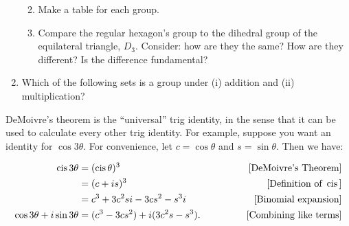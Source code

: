\documentclass[../textbook.tex]{subfiles}
\begin{document}
\begin{enumerate}
\begin{enumerate}
\begin{enumerate}
\begin{multicols}{2}
\end{multicols}
\end{enumerate}
\item Make a table for each group.
\item Compare the regular hexagon's group to the dihedral group of the equilateral triangle, $D_3$. Consider: how are they the same? How are they different? Is the difference fundamental?
\end{enumerate}
\item Which of the following sets is a group under (i) addition and (ii) multiplication?
\begin{enumerate}
\end{enumerate}

\setcounter{problem_i}{\value{enumi}}
\end{enumerate}

\noindent DeMoivre's theorem is the ``universal'' trig identity, in the sense that it can be used to calculate every other trig identity. For example, suppose you want an identity for $\cos 3\theta$. For convenience, let $c=\cos\theta$ and $s=\sin\theta$. Then we have:

\begin{align*}
\operatorname{cis} 3\theta &= (\operatorname{cis} \theta)^3  & \qquad \text{[DeMoivre's Theorem]} \\
&= (c+is)^3 & \qquad \text{[Definition of } \operatorname{cis} \text{]} \\
&= c^3 + 3c^2s i - 3cs^2 - s^3 i & \qquad \text{[Binomial expansion]} \\
\cos 3\theta + i\sin 3\theta &= (c^3 - 3cs^2) + i (3c^2 s - s^3). \qquad & \text{[Combining like terms]}
\end{align*}
\end{document}
